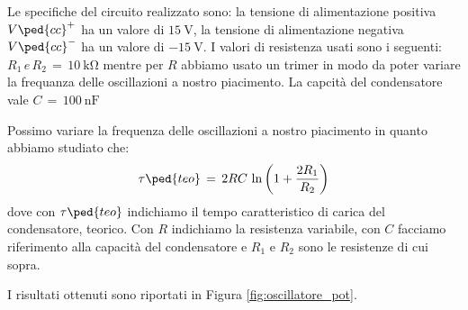 Le specifiche del circuito realizzato sono: la tensione di alimentazione positiva $V\ped{cc}^+$ ha un valore di $\SI{+15}{\volt}$, la tensione di alimentazione negativa $V\ped{cc}^-$ ha un valore di $\SI{-15}{\volt}$. I valori di resistenza usati sono i seguenti: $R_1\,e\,R_2\,=\,\SI{10}{\kilo\ohm}$ mentre per $R$ abbiamo usato un trimer in modo da poter variare la frequanza delle oscillazioni a nostro piacimento. La capcità del condensatore vale $C\,=\,\SI{100}{\nano\farad}$

Possimo variare la frequenza delle oscillazioni a nostro piacimento in quanto abbiamo studiato che:
\begin{equation}
        \tau\ped{teo}\,=\,2RC\,\ln \left(1+\frac{2R_1}{R_2}\right)   
\end{equation}
dove con $\tau\ped{teo}$ indichiamo il tempo caratteristico di carica del condensatore, teorico. Con $R$ indichiamo la resistenza variabile, con $C$ facciamo riferimento alla capacità del condensatore e $R_1$ e $R_2$ sono le resistenze di cui sopra.

I risultati ottenuti sono riportati in Figura \ref{fig:oscillatore_pot}.









